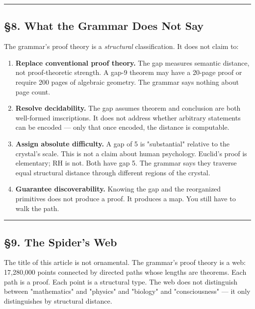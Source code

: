 \documentclass[12pt,a4paper]{article}
\newcommand{\pilcrow}{\S}
\begin{document}
\begin{center}
\rule{0.5\textwidth}{0.4pt}
\end{center}

\subsection{\pilcrow{}8. What the Grammar Does Not Say}

The grammar's proof theory is a \emph{structural} classification. It does not claim to:

\begin{enumerate}
    \item \textbf{Replace conventional proof theory.} The gap measures semantic distance, not proof-theoretic strength. A gap-9 theorem may have a 20-page proof or require 200 pages of algebraic geometry. The grammar says nothing about page count.
    \item \textbf{Resolve decidability.} The gap assumes theorem and conclusion are both well-formed imscriptions. It does not address whether arbitrary statements can be encoded --- only that once encoded, the distance is computable.
    \item \textbf{Assign absolute difficulty.} A gap of 5 is "substantial" relative to the crystal's scale. This is not a claim about human psychology. Euclid's proof is elementary; RH is not. Both have gap 5. The grammar says they traverse equal structural distance through different regions of the crystal.
    \item \textbf{Guarantee discoverability.} Knowing the gap and the reorganized primitives does not produce a proof. It produces a map. You still have to walk the path.
\end{enumerate}

\begin{center}
\rule{0.5\textwidth}{0.4pt}
\end{center}

\subsection{\pilcrow{}9. The Spider's Web}

The title of this article is not ornamental. The grammar's proof theory is a web: 17,280,000 points connected by directed paths whose lengths are theorems. Each path is a proof. Each point is a structural type. The web does not distinguish between "mathematics" and "physics" and "biology" and "consciousness" --- it only distinguishes by structural distance.
\end{document}
